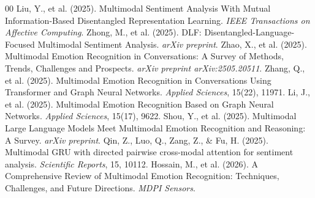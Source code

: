 \documentclass[sn-mathphys,Numbered]{sn-jnl}
\theoremstyle{thmstyleone}
\theoremstyle{thmstyletwo}
\theoremstyle{thmstylethree}
\begin{document}
\begin{thebibliography}{00}
 Liu, Y., et al. (2025). Multimodal Sentiment Analysis With Mutual Information-Based Disentangled Representation Learning. \textit{IEEE Transactions on Affective Computing}.
 Zhong, M., et al. (2025). DLF: Disentangled-Language-Focused Multimodal Sentiment Analysis. \textit{arXiv preprint}.
 Zhao, X., et al. (2025). Multimodal Emotion Recognition in Conversations: A Survey of Methods, Trends, Challenges and Prospects. \textit{arXiv preprint arXiv:2505.20511}.
 Zhang, Q., et al. (2025). Multimodal Emotion Recognition in Conversations Using Transformer and Graph Neural Networks. \textit{Applied Sciences}, 15(22), 11971.
 Li, J., et al. (2025). Multimodal Emotion Recognition Based on Graph Neural Networks. \textit{Applied Sciences}, 15(17), 9622.
 Shou, Y., et al. (2025). Multimodal Large Language Models Meet Multimodal Emotion Recognition and Reasoning: A Survey. \textit{arXiv preprint}.
 Qin, Z., Luo, Q., Zang, Z., \& Fu, H. (2025). Multimodal GRU with directed pairwise cross-modal attention for sentiment analysis. \textit{Scientific Reports}, 15, 10112.
 Hossain, M., et al. (2026). A Comprehensive Review of Multimodal Emotion Recognition: Techniques, Challenges, and Future Directions. \textit{MDPI Sensors}.
\end{thebibliography}
\end{document}

